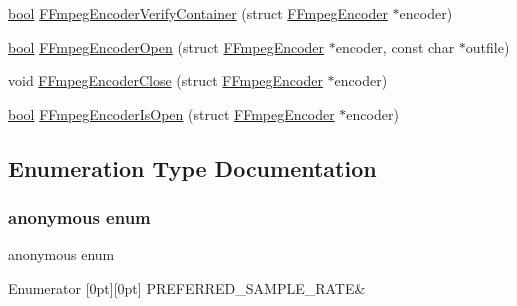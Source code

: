 \begin{DoxyCompactItemize}
\item 
\mbox{\hyperlink{libretro_8h_a4a26dcae73fb7e1528214a068aca317e}{bool}} \mbox{\hyperlink{ffmpeg-encoder_8c_a57dc90db7ec7abc72021c7faf1173e01}{F\+Fmpeg\+Encoder\+Verify\+Container}} (struct \mbox{\hyperlink{ffmpeg-encoder_8h_struct_f_fmpeg_encoder}{F\+Fmpeg\+Encoder}} $\ast$encoder)
\item 
\mbox{\hyperlink{libretro_8h_a4a26dcae73fb7e1528214a068aca317e}{bool}} \mbox{\hyperlink{ffmpeg-encoder_8c_ae319fa73d21d047862d156fc05902af3}{F\+Fmpeg\+Encoder\+Open}} (struct \mbox{\hyperlink{ffmpeg-encoder_8h_struct_f_fmpeg_encoder}{F\+Fmpeg\+Encoder}} $\ast$encoder, const char $\ast$outfile)
\item 
void \mbox{\hyperlink{ffmpeg-encoder_8c_a9e740ab5a264bd7fe8dec61593d3b347}{F\+Fmpeg\+Encoder\+Close}} (struct \mbox{\hyperlink{ffmpeg-encoder_8h_struct_f_fmpeg_encoder}{F\+Fmpeg\+Encoder}} $\ast$encoder)
\item 
\mbox{\hyperlink{libretro_8h_a4a26dcae73fb7e1528214a068aca317e}{bool}} \mbox{\hyperlink{ffmpeg-encoder_8c_a3b83672eac569095bfa3a613f8301914}{F\+Fmpeg\+Encoder\+Is\+Open}} (struct \mbox{\hyperlink{ffmpeg-encoder_8h_struct_f_fmpeg_encoder}{F\+Fmpeg\+Encoder}} $\ast$encoder)
\end{DoxyCompactItemize}


\subsection{Enumeration Type Documentation}
\mbox{\label{ffmpeg-encoder_8c_adf764cbdea00d65edcd07bb9953ad2b7}} 
\subsubsection{\texorpdfstring{anonymous enum}{anonymous enum}}
{\footnotesize\ttfamily anonymous enum}

\begin{DoxyEnumFields}{Enumerator}
[0pt][0pt]{}\mbox{\label{ffmpeg-encoder_8c_adf764cbdea00d65edcd07bb9953ad2b7a2656e6725d5bdaffeeb5d585d0b1d892}} 
P\+R\+E\+F\+E\+R\+R\+E\+D\+\_\+\+S\+A\+M\+P\+L\+E\+\_\+\+R\+A\+TE&\\
\hline

\end{DoxyEnumFields}


